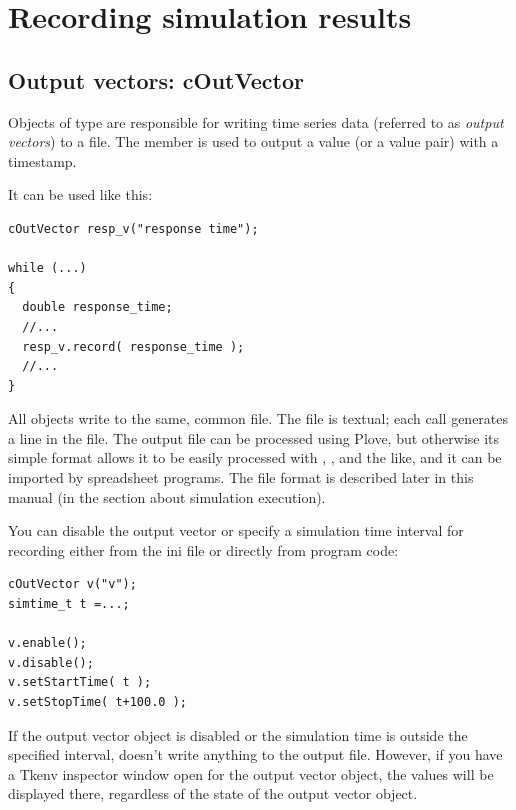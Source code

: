 \section{Recording simulation results}

\subsection{Output vectors: cOutVector}
\label{sec:ch-sim-lib:cOutVector}

Objects of type  are responsible for writing time series
data (referred to as \textit{output vectors}) to a file. The 
member is used to output a value (or a value pair) with a timestamp.

It can be used like this:

\begin{verbatim}
cOutVector resp_v("response time");

while (...)
{
  double response_time;
  //...
  resp_v.record( response_time );
  //...
}
\end{verbatim}


All  objects write to the same, common file. The
file is textual; each  call generates a line in the
file. The output file can be processed using Plove, but otherwise its
simple format allows it to be easily processed with ,
,  and the like, and it can be imported by
spreadsheet programs.  The file format is described later in this
manual (in the section about simulation execution).

You can disable the output vector or specify a
simulation time interval for recording either from the ini file or
directly from program code:

\begin{verbatim}
cOutVector v("v");
simtime_t t =...;

v.enable();
v.disable();
v.setStartTime( t );
v.setStopTime( t+100.0 );
\end{verbatim}


If the output vector object is disabled or the simulation time is
outside the specified interval,  doesn't write
anything to the output file. However, if you have a Tkenv inspector
window open for the output vector object,
the values will be displayed there, regardless of the state of the
output vector object.





